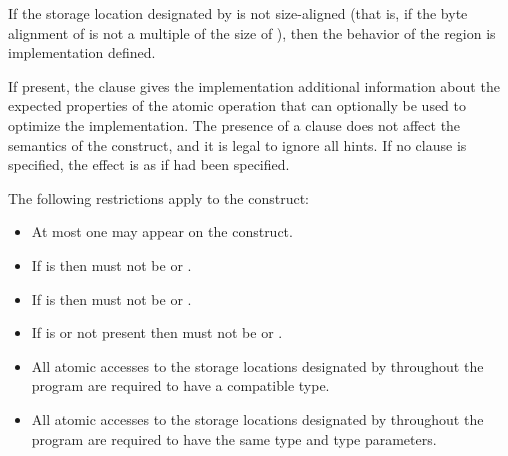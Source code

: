 If the storage location designated by  is not size-aligned (that is, if the byte alignment
of  is not a multiple of the size of ), then the behavior of the  region is
implementation defined.

If present, the  clause gives the implementation additional
information about the expected properties of the atomic operation
that can optionally be used to optimize the implementation.
The presence of a  clause does not affect the semantics of
the  construct, and it is legal to ignore all hints.
If no  clause is specified, the effect is as if  had been specified.

\begin{samepage}


\restrictions

The following restrictions apply to the  construct:

\begin{itemize}
\item At most one  may appear on the construct.

\item If  is  then 
    must not be  or .

\item If  is  then 
    must not be  or .

\item If  is  or not present then 
    must not be  or .
\end{itemize}

\newpage  %
\begin{ccppspecific}
\begin{itemize}
\item All atomic accesses to the storage locations designated by  throughout the program
are required to have a compatible type.
\end{itemize}
\end{ccppspecific}
\end{samepage}

\begin{fortranspecific}
\begin{itemize}
\item All atomic accesses to the storage locations designated by  throughout the program
are required to have the same type and type parameters.
\end{itemize}
\end{fortranspecific}

